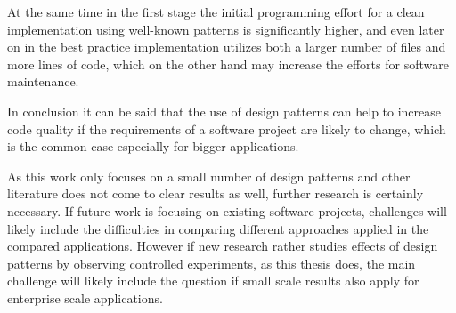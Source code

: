 At the same time in the first stage the initial programming effort for a clean implementation using well-known patterns is significantly higher, and even later on in the best practice implementation utilizes both a larger number of files and more lines of code, which on the other hand may increase the efforts for software maintenance.

In conclusion it can be said that the use of design patterns can help to increase code quality if the requirements of a software project are likely to change, which is the common case especially for bigger applications. 

As this work only focuses on a small number of design patterns and other literature does not come to clear results as well, further research is certainly necessary. If future work is focusing on existing software projects, challenges will likely include the difficulties in comparing different approaches applied in the compared applications. However if new research rather studies effects of design patterns by observing controlled experiments, as this thesis does, the main challenge will likely include the question if small scale results also apply for enterprise scale applications.

